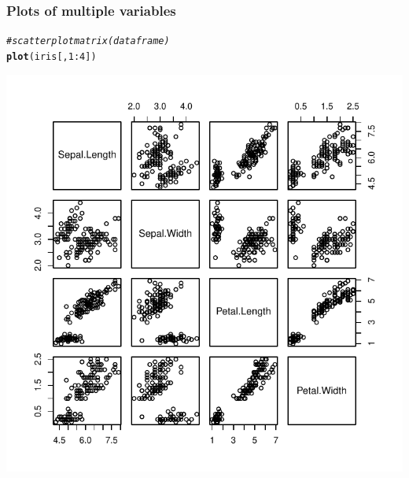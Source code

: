 \documentclass[12pt]{beamer}\usepackage[]{graphicx}\usepackage[]{color}
\makeatletter
\newcommand{\hlnum}[1]{\textcolor[rgb]{0.686,0.059,0.569}{#1}}%
\newcommand{\hlcom}[1]{\textcolor[rgb]{0.678,0.584,0.686}{\textit{#1}}}%
\newcommand{\hlopt}[1]{\textcolor[rgb]{0,0,0}{#1}}%
\newcommand{\hlstd}[1]{\textcolor[rgb]{0.345,0.345,0.345}{#1}}%
\newcommand{\hlkwd}[1]{\textcolor[rgb]{0.737,0.353,0.396}{\textbf{#1}}}%
\newenvironment{kframe}{%
 \def\at@end@of@kframe{}%
 \ifinner\ifhmode%
  \def\at@end@of@kframe{\end{minipage}}%
  \begin{minipage}{\columnwidth}%
 \fi\fi%
 \def\FrameCommand##1{\hskip\@totalleftmargin \hskip-\fboxsep
 \colorbox{shadecolor}{##1}\hskip-\fboxsep
     \hskip-\linewidth \hskip-\@totalleftmargin \hskip\columnwidth}%
 \MakeFramed {\advance\hsize-\width
   \@totalleftmargin\z@ \linewidth\hsize
   \@setminipage}}%
 {\par\unskip\endMakeFramed%
 \at@end@of@kframe}
\newenvironment{knitrout}{}{} %
\makeatother
\begin{document}
\begin{frame}[fragile]
\frametitle{Plots of multiple variables}
\begin{knitrout}\footnotesize
{}\color{fgcolor}\begin{kframe}
\begin{alltt}
\hlcom{# scatter plot matrix (data frame)}
\hlkwd{plot}\hlstd{(iris[ ,} \hlnum{1}\hlopt{:}\hlnum{4}\hlstd{])}
\end{alltt}


{\ttfamily\noindent\color{warningcolor}{\#\# Warning: closing unused connection 5 (http://gastonsanchez.com/education.csv)}}\end{kframe}

{\centering \includegraphics[width=.6\linewidth,height=.6\linewidth]{figure/unnamed-chunk-21-1} 

}



\end{knitrout}
\end{frame}

\end{document}
